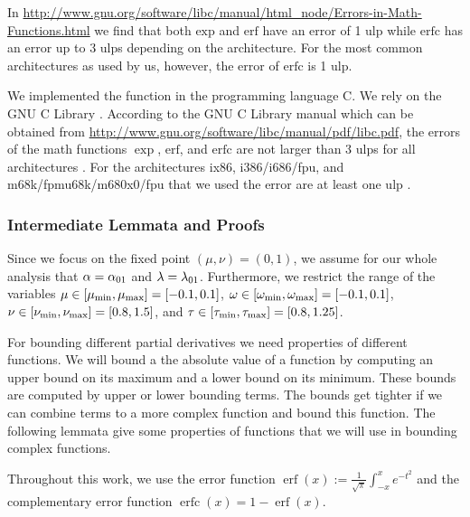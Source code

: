\documentclass{article}
\DeclareMathOperator{\erfc}{erfc}
\DeclareMathOperator{\erf}{erf}
\begin{document}
In
\url{http://www.gnu.org/software/libc/manual/html_node/Errors-in-Math-Functions.html}
we find that both $\mathrm{exp}$ and
$\mathrm{erf}$ have an error of 1 ulp while $\mathrm{erfc}$ has an
error up to 3 ulps depending on the architecture.
For the most common architectures as used by us, however, the error of
$\mathrm{erfc}$ is 1 ulp.



We implemented the function in the programming language C.
We rely on the GNU C Library \citep{Loosemore:16}.
According to the GNU C Library manual which can be obtained from
\url{http://www.gnu.org/software/libc/manual/pdf/libc.pdf},
the errors of the math functions $\exp$, $\mathrm{erf}$, and
$\mathrm{erfc}$
are not larger than 3 ulps for all architectures
\citep[pp. 528]{Loosemore:16}.
For the architectures ix86, i386/i686/fpu, and m68k/fpmu68k/m680x0/fpu
that we used the error are at least one ulp
\citep[pp. 528]{Loosemore:16}.




\subsubsection{Intermediate Lemmata and Proofs}
\label{sec:smallLemmata}

Since we focus on the fixed point 
$(\mu,\nu)=(0,1)$,
we assume for our whole analysis
that $\alpha = \alpha_{\rm 01}$ and $\lambda=\lambda_{\rm 01}$.
Furthermore, we restrict the range of the variables
$\mu \in [\mu_{\rm min},\mu_{\rm max}]=[-0.1,0.1]$,
$\omega \in [\omega_{\rm min},\omega_{\rm max}]=[-0.1,0.1]$,
$\nu \in [\nu_{\rm min},\nu_{\rm max}]=[0.8,1.5]$, and
$\tau \in [\tau_{\rm min},\tau_{\rm max}]=[0.8,1.25]$.

For bounding different partial derivatives we need properties of
different functions. 
We will bound a the absolute value of a function by computing an upper
bound on its maximum and a lower bound on its minimum. These bounds
are computed by upper or lower bounding terms. The bounds get tighter
if we can combine terms to a more complex function and bound this
function. The following lemmata give some properties of functions that
we will use in bounding complex functions. 

Throughout this work, we use the error function $\erf(x):=\frac{1}{\sqrt{\pi}} \int_{-x} ^x e^{-t^2}$ and the complementary
error function $\erfc (x) = 1 - \erf(x)$.  
 
\end{document}
